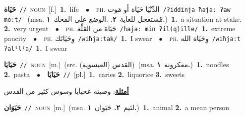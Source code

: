 \documentclass[10pt,a4paper,twoside]{article} %
\begin{document}
\begin{multicols}{2}
{\setlength\topsep{0pt}\textbf{\foreignlanguage{arabic}{حَيَاة}}\ {\color{gray}\texttt{//}\color{black}}\ \textsc{noun}\ [f.]\ \textbf{1.}~life\ \ $\bullet$\ \ \textsc{ph.} \color{gray} \foreignlanguage{arabic}{الدِّنْيَا حَيَاة أَو مَوت}\color{black}\ {\color{gray}\texttt{/{\sffamily ʔiddinja ħajaː ʔaw moːt}/}\color{black}}\ \color{gray} (msa. \foreignlanguage{arabic}{مًستعجل للغاية}~\foreignlanguage{arabic}{\textbf{٢.}}  .\foreignlanguage{arabic}{الوضع على المحك}~\foreignlanguage{arabic}{\textbf{١.}})\color{black}\ \textbf{1.}~a situation at stake.  \textbf{2.}~very urgent\ \ $\bullet$\ \ \textsc{ph.} \color{gray} \foreignlanguage{arabic}{حَيَاة من القلِّة}\color{black}\ {\color{gray}\texttt{/{\sffamily ħajaː min ʔil(q)ille}/}\color{black}}\ \textbf{1.}~extreme paucity\ \ $\bullet$\ \ \textsc{ph.} \color{gray} \foreignlanguage{arabic}{وِحَيَاتَك}\color{black}\ {\color{gray}\texttt{/{\sffamily wiħjaːtak}/}\color{black}}\ \textbf{1.}~I swear\ \ $\bullet$\ \ \textsc{ph.} \color{gray} \foreignlanguage{arabic}{وِحَيَاة الله}\color{black}\ {\color{gray}\texttt{/{\sffamily wiħjaːt ʔalˤlˤa}/}\color{black}}\ \textbf{1.}~I swear\ } \vspace{2mm}

{\setlength\topsep{0pt}\textbf{\foreignlanguage{arabic}{حَيَايَا}}\ {\color{gray}\texttt{//}\color{black}}\ \textsc{noun}\ [m.]\ (src. \color{gray}\foreignlanguage{arabic}{القدس (العيسوية)}\color{black})\ \color{gray}(msa. \foreignlanguage{arabic}{معكرونة}~\foreignlanguage{arabic}{\textbf{١.}})\color{black}\ \textbf{1.}~noodles  \textbf{2.}~pasta\ \ $\bullet$\ \ \setlength\topsep{0pt}\textbf{\foreignlanguage{arabic}{حَيَايَا}}\ {\color{gray}\texttt{//}\color{black}}\ [pl.]\ \textbf{1.}~caries  \textbf{2.}~liquorice  \textbf{3.}~sweets\  \begin{flushright}\color{gray}\foreignlanguage{arabic}{\textbf{\underline{\foreignlanguage{arabic}{أمثلة}}}: وصيته عحيايا وسوس كثير من القدس}\end{flushright}\color{black}} \vspace{2mm}

{\setlength\topsep{0pt}\textbf{\foreignlanguage{arabic}{حَيَوَان}}\ {\color{gray}\texttt{//}\color{black}}\ \textsc{noun}\ [m.]\ \color{gray}(msa. \foreignlanguage{arabic}{لئيم}~\foreignlanguage{arabic}{\textbf{٢.}}  \foreignlanguage{arabic}{حَيَوان}~\foreignlanguage{arabic}{\textbf{١.}})\color{black}\ \textbf{1.}~animal  \textbf{2.}~a mean person\ } \vspace{2mm}


\end{multicols}
\end{document}
